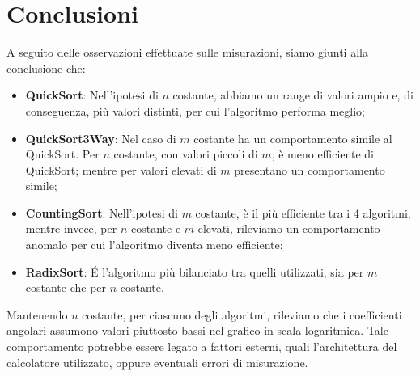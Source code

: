 \documentclass[a4paper, 11pt]{article}
\begin{document}
\section{Conclusioni}
A seguito delle osservazioni effettuate sulle misurazioni, siamo giunti alla conclusione che:
\begin{itemize}
	\item \textbf{QuickSort}: Nell'ipotesi di $n$ costante, abbiamo un range di valori ampio e, di conseguenza, più valori distinti, per cui l'algoritmo performa meglio;
	\item \textbf{QuickSort3Way}: Nel caso di $m$ costante ha un comportamento simile al QuickSort. Per $n$ costante, con valori piccoli di $m$, è meno efficiente di QuickSort; mentre per valori elevati di $m$ presentano un comportamento simile;
	\item \textbf{CountingSort}: Nell'ipotesi di $m$ costante, è il più efficiente tra i 4 algoritmi, mentre invece, per $n$ costante e $m$ elevati, rileviamo un comportamento anomalo per cui l'algoritmo diventa meno efficiente;
	\item \textbf{RadixSort}: É l'algoritmo più bilanciato tra quelli utilizzati, sia per $m$ costante che per $n$ costante.
\end{itemize}
Mantenendo $n$ costante, per ciascuno degli algoritmi, rileviamo che i coefficienti angolari assumono valori piuttosto bassi nel grafico in scala logaritmica. Tale comportamento potrebbe essere legato a fattori esterni, quali l'architettura del calcolatore utilizzato, oppure eventuali errori di misurazione.
\end{document}

